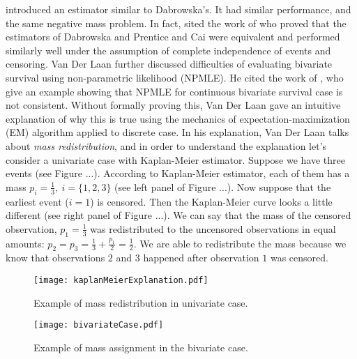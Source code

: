 \documentclass[]{article}
\begin{document}
\cite{prentice1992covariance} introduced an estimator similar to Dabrowska's. It had similar performance, and the same negative mass problem. In fact, \cite{van1997nonparametric} sited the work of \cite{gill1990survey} who proved that the estimators of Dabrowska and Prentice and Cai were equivalent and performed similarly well under the assumption of complete independence of events and censoring. Van Der Laan further discussed difficulties of evaluating bivariate survival using non-parametric likelihood (NPMLE). He cited the work of \cite{tsai1986nonparametric}, who give an example showing that NPMLE for continuous bivariate survival case is not consistent. Without formally proving this, Van Der Laan gave an intuitive explanation of why this is true using the mechanics of expectation-maximization (EM) algorithm applied to discrete case. In his explanation, Van Der Laan talks about \emph{mass redistribution}, and in order to understand the explanation let's consider a univariate case with Kaplan-Meier estimator. Suppose we have three events (see Figure ...). According to Kaplan-Meier estimator, each of them has a mass $p_i = \frac{1}{3},~i=\{1,2,3\}$ (see left panel of Figure ...). Now suppose that the earliest event ($i=1$) is censored. Then the Kaplan-Meier curve looks a little different (see right panel of Figure ...). We can say that the mass of the censored observation, $p_1=\frac{1}{3}$ was redistributed to the uncensored observations in equal amounts: $p_2=p_3=\frac{1}{3}+\frac{p_1}{2} = \frac{1}{2}$. We are able to redistribute the mass because we know that observations $2$ and $3$ happened after observation $1$ was censored.\\

\begin{figure}[!h]
\caption{Example of mass redistribution in univariate case.}
\texttt{[image: kaplanMeierExplanation.pdf]}
\label{fig:km}
\end{figure}

\begin{figure}[!h]
\caption{Example of mass assignment in the bivariate case.}
\texttt{[image: bivariateCase.pdf]}
\label{fig:bc}
\end{figure}
\end{document}
